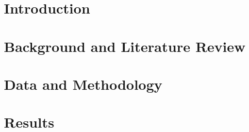\documentclass[english, a4paper, 12pt, twoside, openany]{book}
\begin{document}
\def\biblio{}   %

\thesisLicensePage{}%
\thesisDedicationPage{}%
\thesisAcknowledgementsPage{}%
\thesisAbstractPage{}%



\newpage
{   %
	\tableofcontents
}

\newpage
{
	\listoftables}

\newpage
{
	\listoffigures}

\newpage
{}   %
\setcounter{page}{1}                                    %


\chapter{Introduction}\label{chap:introduction}                      %
\clearpage                                  %

\chapter{Background and Literature Review}\label{chap:background}
    
\clearpage

\chapter{Data and Methodology}\label{chap:methods}
    
\clearpage
  
\chapter{Results}\label{chap:results}
    
\clearpage
\end{document}
